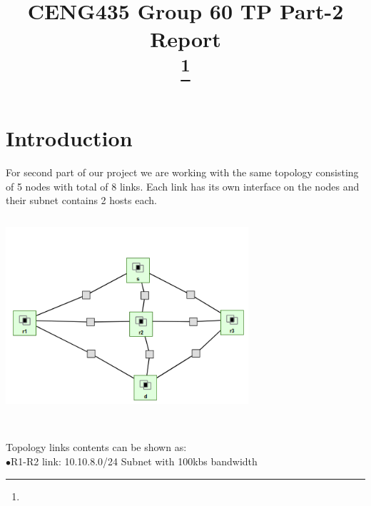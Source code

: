 \documentclass[conference]{IEEEtran}
\begin{document}
\title{CENG435 Group 60 TP Part-2 Report\\
\thanks{}
}

\author{
\and
{}

}

\maketitle





\section{Introduction}
\large

For second part of our project we are working with the same topology consisting of 5 nodes with total of 8 links. Each link has its own interface on the nodes and their subnet contains 2 hosts each. \\
\includegraphics[width = 90mm, height = 80mm]{topologyp2.png}\\ \qquad \\


Topology links contents can be shown as:\\

$\bullet$R1-R2 link: 10.10.8.0/24 Subnet with 100kbs bandwidth\\
\end{document}
